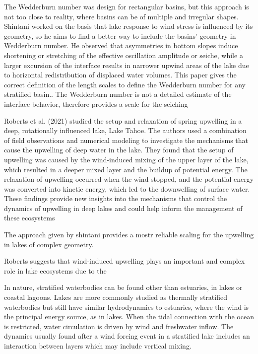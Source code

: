 \documentclass[tesis.tex]{subfiles}
\begin{document}
The Wedderburn number was design for rectangular basins, but this approach is not too close to reality, where basins can be of multiple and irregular shapes. Shintani worked on the basis that lake response to wind stress is influenced by its geometry, so he aims to find a better way to include the basins' geometry in Wedderburn number. He observed that asymmetries in bottom slopes induce shortening or stretching of the effective oscillation amplitude or seiche, while a larger excursion of the interface results in narrower
upwind areas of the lake due to horizontal redistribution of displaced water volumes. This paper gives the correct
definition of the length scales to define the Wedderburn number for any stratified basin.. The Wedderburn number is not a detailed estimate of the interface behavior, therefore provides a scale for the seiching

Roberts et al. (2021) studied the setup and relaxation of spring upwelling in a deep, rotationally influenced lake, Lake Tahoe. The authors used a combination of field observations and numerical modeling to investigate the mechanisms that cause the upwelling of deep water in the lake. They found that the setup of upwelling was caused by the wind-induced mixing of the upper layer of the lake, which resulted in a deeper mixed layer and the buildup of potential energy. The relaxation of upwelling occurred when the wind stopped, and the potential energy was converted into kinetic energy, which led to the downwelling of surface water. These findings provide new insights into the mechanisms that control the dynamics of upwelling in deep lakes and could help inform the management of these ecosystems



The approach given by shintani provides a mostr reliable scaling for the upwelling in lakes of complex geometry.

Roberts suggests that wind-induced upwelling plays an important and complex role in lake ecosystems due to the 

In nature, stratified waterbodies can be found other than estuaries, in lakes or coastal lagoons. Lakes are more commonly studied as thermally stratified waterbodies but still have similar hydrodynamics to estuaries, where the wind is the principal energy source, as in lakes. When the tidal connection with the ocean is restricted, water circulation is driven by wind and freshwater inflow. The dynamics usually found after a wind forcing event in a stratified lake includes an interaction between layers which may include vertical mixing. \\
\end{document}

